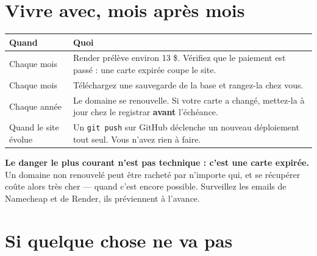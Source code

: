 \documentclass[11pt,a4paper]{article}
\newcommand{\saisir}[1]{\texttt{#1}}
\begin{document}
\section{Vivre avec, mois après mois}

\begin{center}
\begin{tabularx}{\textwidth}{@{}lX@{}}
\toprule
\textbf{Quand} & \textbf{Quoi} \\
\midrule
Chaque mois & Render prélève environ 13 \$. Vérifiez que le paiement est passé : une carte expirée coupe le site. \\
Chaque mois & Téléchargez une sauvegarde de la base et rangez-la chez vous. \\
Chaque année & Le domaine se renouvelle. Si votre carte a changé, mettez-la à jour chez le registrar \textbf{avant} l'échéance. \\
Quand le site évolue & Un \saisir{git push} sur GitHub déclenche un nouveau déploiement tout seul. Vous n'avez rien à faire. \\
\bottomrule
\end{tabularx}
\end{center}

\begin{attention}
\textbf{Le danger le plus courant n'est pas technique : c'est une carte
expirée.} Un domaine non renouvelé peut être racheté par n'importe qui, et se
récupérer coûte alors très cher — quand c'est encore possible. Surveillez les
emails de Namecheap et de Render, ils préviennent à l'avance.
\end{attention}

\section{Si quelque chose ne va pas}
\end{document}

